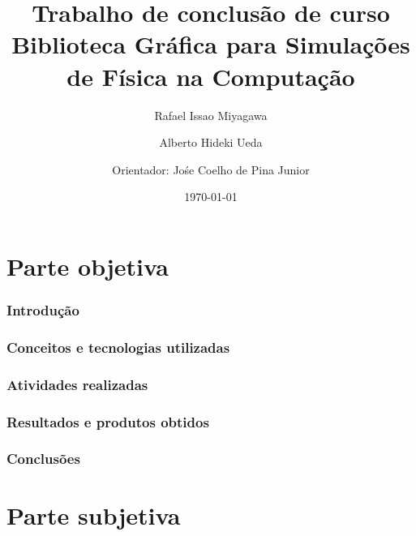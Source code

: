 \documentclass[a4paper,12pt,titlepage]{article}
\title{Trabalho de conclusão de curso \\
Biblioteca Gráfica para Simulações de Física na Computação}
\author{Rafael Issao Miyagawa \and Alberto Hideki Ueda \and
        Orientador: Jośe Coelho de Pina Junior }
\date{\today}
\begin{document}
\maketitle


\tableofcontents

\pagebreak

\part{Parte objetiva}

\section{Introdução}

\newpage

\section{Conceitos e tecnologias utilizadas}

\newpage

\section{Atividades realizadas}

\newpage

\section{Resultados e produtos obtidos}
\newpage

\section{Conclusões}
\newpage

%
%
\newpage

\part{Parte subjetiva}
\end{document}
